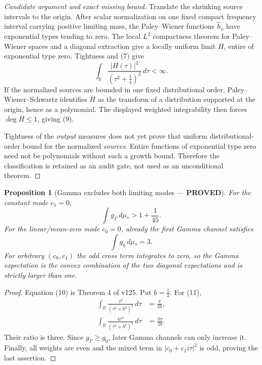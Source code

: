 \documentclass[11pt]{article}
\newcommand{\PROVED}{\textcolor{green!40!black}{\textbf{PROVED}}}
\newtheorem{proposition}{Proposition}
\begin{document}
\begin{proof}[Candidate argument and exact missing bound]
Translate the shrinking source intervals to the origin.  After scalar
normalization on one fixed compact frequency interval carrying positive
limiting mass, the Paley--Wiener functions $\widehat h_\nu$ have
exponential types tending to zero.  The local $L^2$ compactness theorem
for Paley--Wiener spaces and a diagonal extraction give a locally uniform
limit $H$, entire of exponential type zero.  Tightness and (7) give
\[
 \int_{\mathbb R}\frac{|H(\tau)|^2}
      {(\tau^2+\frac14)^2}\,d\tau<\infty.
\]
If the normalized sources are bounded in one fixed distributional order,
Paley--Wiener--Schwartz identifies $H$ as the transform of a distribution
supported at the origin, hence as a polynomial.  The displayed weighted
integrability then forces $\deg H\le1$, giving (9).

Tightness of the \emph{output} measures does not yet prove that uniform
distributional-order bound for the normalized \emph{sources}.  Entire
functions of exponential type zero need not be polynomials without such a
growth bound.  Therefore the classification is retained as an audit gate,
not used as an unconditional theorem.
\end{proof}

\begin{proposition}[Gamma excludes both limiting modes --- \PROVED]
For the constant mode $c_1=0$,
\begin{equation}
 \int g_\Gamma\,d\mu_*>1+\frac1{45}.                     \tag{10}
\end{equation}
For the linear/mean-zero mode $c_0=0$, already the first Gamma channel
satisfies
\begin{equation}
 \int g_0\,d\mu_*=3.                                      \tag{11}
\end{equation}
For arbitrary $(c_0,c_1)$ the odd cross term integrates to zero, so the
Gamma expectation is the convex combination of the two diagonal
expectations and is strictly larger than one.
\end{proposition}

\begin{proof}
Equation (10) is Theorem 4 of v125.  Put $b=\frac12$.  For (11),
\begin{align*}
 \int_{\mathbb R}\frac{\tau^2}{(\tau^2+b^2)^2}\,d\tau
 &=\frac\pi{2b},\\
 \int_{\mathbb R}
 \frac{4\tau^4}{(\tau^2+b^2)^3}\,d\tau
 &=\frac{3\pi}{2b}.
\end{align*}
Their ratio is three.  Since $g_\Gamma\ge g_0$, later Gamma channels can
only increase it.  Finally, all weights are even and the mixed term in
$|c_0+c_1i\tau|^2$ is odd, proving the last assertion.
\end{proof}
\end{document}
